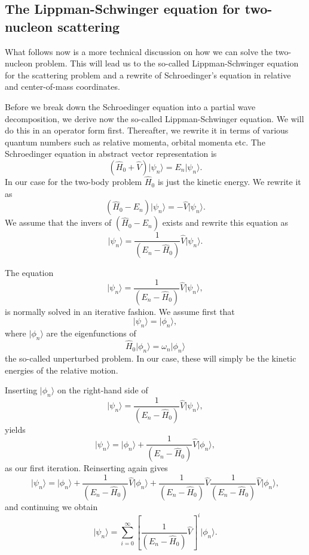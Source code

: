 \documentclass[%
oneside,                 %
final,                   %
10pt]{article}
\begin{document}
\noindent
\subsection{The Lippman-Schwinger equation for two-nucleon scattering}

What follows now is a more technical discussion on how we can solve the two-nucleon problem.
This will lead us to the so-called Lippman-Schwinger equation for the scattering problem and a rewrite of Schroedinger's equation in relative and center-of-mass coordinates. 


Before we break down the Schroedinger equation into a partial wave decomposition, we derive now the so-called Lippman-Schwinger equation. We will do this in an operator form first.
Thereafter, we rewrite it in terms of various quantum numbers such as relative momenta, orbital momenta etc. 
The Schroedinger equation in abstract vector representation is
\[
  \left( \hat{H}_0 + \hat{V} \right) \vert \psi_n \rangle = E_n \vert\psi_n \rangle. 
\]
In our case for the two-body problem $\hat{H}_0$ is just the kinetic energy. 
We rewrite it as 
\[
\left( \hat{H}_0 -E_n \right)\vert\psi_n \rangle =-\hat{V}\vert \psi_n \rangle . 
\]
We assume that the invers of $\left( \hat{H}_0 -E_n\right)$ exists and rewrite this equation as
\[
\vert\psi_n \rangle =\frac{1}{\left( E_n -\hat{H}_0\right)}\hat{V}\vert \psi_n \rangle . 
\]

The equation
\[
\vert \psi_n \rangle =\frac{1}{\left( E_n -\hat{H}_0\right)}\hat{V}\vert \psi_n \rangle,
\]
is normally solved in an iterative fashion. 
We assume first that
\[
\vert\psi_n \rangle = \vert\phi_n \rangle,
\] 
where $\vert\phi_n \rangle$ are the eigenfunctions of 
\[
\hat{H}_0\vert \phi_n \rangle=\omega_n\vert \phi_n \rangle
\]
the so-called unperturbed problem. In our case, these will simply be the kinetic energies of the relative motion. 

Inserting  $\vert\phi_n \rangle$  on the right-hand side of 
\[
\vert \psi_n \rangle =\frac{1}{( E_n -\hat{H}_0)}\hat{V}\vert \psi_n \rangle,
\]
yields
\[
\vert \psi_n \rangle =\vert\phi_n \rangle+\frac{1}{\left( E_n -\hat{H}_0\right)}\hat{V}\vert \phi_n \rangle,
\]
as our first iteration. 
Reinserting again gives
\[
\vert \psi_n \rangle =\vert\phi_n \rangle+\frac{1}{\left( E_n -\hat{H}_0\right)}\hat{V}\vert \phi_n \rangle+\frac{1}{( E_n -\hat{H}_0)}\hat{V}\frac{1}{\left( E_n -\hat{H}_0\right)}\hat{V}\vert \phi_n \rangle,
\]
and continuing we obtain
\[
\vert \psi_n \rangle =\sum_{i=0}^{\infty}\left[\frac{1}{( E_n -\hat{H}_0)}\hat{V}\right]^i\vert \phi_n \rangle.
\]
\end{document}
